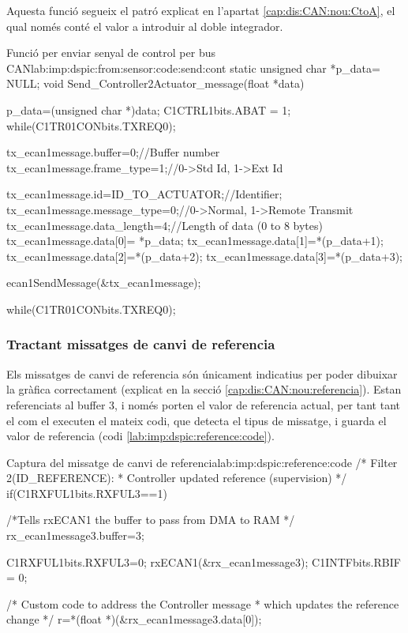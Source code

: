 Aquesta funció segueix el patró explicat en l'apartat \ref{cap:dis:CAN:nou:CtoA}, el qual només conté el valor a introduir al doble integrador.

\begin{code_c}{Funció per enviar senyal de control per bus CAN}{lab:imp:dspic:from:sensor:code:send:cont}
static unsigned char *p_data= NULL;
void Send_Controller2Actuator_message(float *data)
{
	p_data=(unsigned char *)data;
	C1CTRL1bits.ABAT = 1;
	while(C1TR01CONbits.TXREQ0){};

	tx_ecan1message.buffer=0;//Buffer number
	tx_ecan1message.frame_type=1;//0->Std Id, 1->Ext Id

	tx_ecan1message.id=ID_TO_ACTUATOR;//Identifier;
	tx_ecan1message.message_type=0;//0->Normal, 1->Remote Transmit
	tx_ecan1message.data_length=4;//Length of data (0 to 8 bytes)
	tx_ecan1message.data[0]= *p_data;
	tx_ecan1message.data[1]=*(p_data+1);
	tx_ecan1message.data[2]=*(p_data+2);
	tx_ecan1message.data[3]=*(p_data+3);

	ecan1SendMessage(&tx_ecan1message);

	while(C1TR01CONbits.TXREQ0){};
}
\end{code_c}


\subsubsection{Tractant missatges de canvi de referencia}\label{lab:imp:dspic:ID_REFERENCE}

Els missatges de canvi de referencia són únicament indicatius per poder dibuixar la gràfica correctament (explicat en la secció \ref{cap:dis:CAN:nou:referencia}). Estan referenciats al buffer 3, i només porten el valor de referencia actual, per tant tant el \SensorActuador com el \Monitor executen el mateix codi, que detecta el tipus de missatge, i guarda el valor de referencia (codi \ref{lab:imp:dspic:reference:code}).


\begin{code_c}{Captura del missatge de canvi de referencia}{lab:imp:dspic:reference:code}
/* Filter 2(ID_REFERENCE):
 * Controller updated reference (supervision) */
if(C1RXFUL1bits.RXFUL3==1)
{
	/*Tells rxECAN1 the buffer to pass from DMA to RAM */
	rx_ecan1message3.buffer=3;

	C1RXFUL1bits.RXFUL3=0;
	rxECAN1(&rx_ecan1message3);
	C1INTFbits.RBIF = 0;

	/* Custom code to address the Controller message
	 * which updates the reference change */
	r=*(float *)(&rx_ecan1message3.data[0]);
}
\end{code_c}

